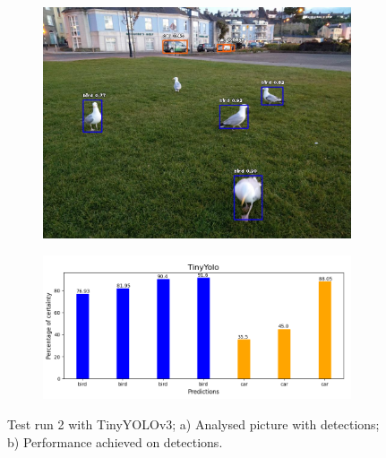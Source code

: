           \begin{figure}[H]
            \centering
            \captionsetup{justification=centering}
    
            \begin{subfigure}{0.29\textwidth}
            \includegraphics[width=\textwidth]{Sections/4InitialWork/4_images_obj_run3/yolo_tiny.jpg} 
            \caption{}
            \end{subfigure}
            \begin{subfigure}{0.6\textwidth}
            \includegraphics[width=\textwidth]{Sections/4InitialWork/4_images_obj_run3/yolo_tiny_graph.png}
            \caption{}
            \end{subfigure}
            
            \caption[Test run 2 with TinyYOLOv3]{ 
            Test run 2 with TinyYOLOv3; a) Analysed picture with detections; b) Performance achieved on detections. }
            \label{fig:tiny_2}
            \end{figure}

